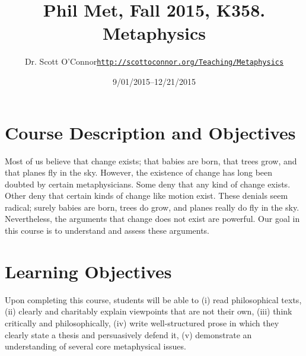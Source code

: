 \documentclass[11pt,article,oneside]{memoir}
\def\myauthor{Author}
\def\mytitle{Title}
\def\mycopyright{\myauthor}
\def\myweb{\href{http://scottoconnor.org/Teaching/Metaphysics}{http://scottoconnor.org/Teaching/Metaphysics}}
\def\myauthor{Dr. Scott O'Connor}
\def\mytitle{{\normalsize Phil Met, Fall 2015, K358. \newline} \HUGE Metaphysics}
\begin{document}
\setsansfont[Mapping=tex-text]{Georgia} 
\setmonofont[Mapping=tex-text,Scale=0.8]{Georgia} 

\def\ind{\hangindent=1 true cm\hangafter=1 \noindent}
\def\labelitemi{$\cdot$}

\pagestyle{kjh}

\title{\LARGE\mytitle}     
\author{\Large\myauthor \newline \footnotesize\texttt{\noindent\myweb}}
\date{9/01/2015--12/21/2015}

\published{\,}

\maketitle




%
%

\section{Course Description and Objectives}

Most of us believe that change exists; that babies are born, that trees grow, and that planes fly in the sky. However, the existence of change has long been doubted by certain metaphysicians. Some deny that any kind of change exists. Other deny that certain kinds of change like motion exist. These denials seem radical; surely babies are born, trees do grow, and planes really do fly in the sky. Nevertheless, the arguments that change does not exist are powerful. Our goal in this course is to understand and assess these arguments. 


\section{Learning Objectives}

Upon completing this course, students will be able to (i) read
philosophical texts, (ii) clearly and charitably explain viewpoints that
are not their own, (iii) think critically and philosophically, (iv)
write well-structured prose in which they clearly state a thesis and
persuasively defend it, (v) demonstrate an understanding of several core
metaphysical issues.
\end{document}
